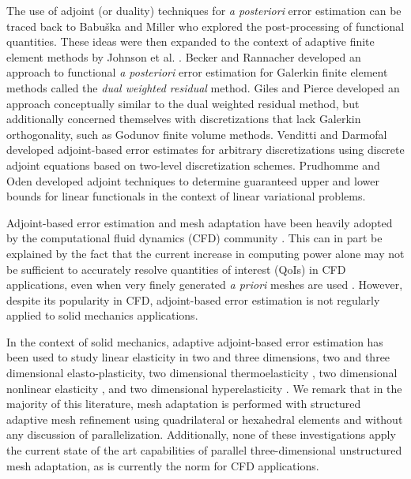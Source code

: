 The use of adjoint (or duality) techniques for \emph{a posteriori} error
estimation can be traced back to Babu\v{s}ka and Miller
\cite{babuska1984post1, babuska1984post2, babuska1984post3} who explored the
post-processing of functional quantities. These ideas were then expanded to the
context of adaptive finite element methods by Johnson et al.
\cite{eriksson1996computational}. Becker and Rannacher \cite{becker2001optimal}
developed an approach to functional \emph{a posteriori} error estimation for
Galerkin finite element methods called the \emph{dual weighted residual}
method. Giles and Pierce \cite{giles2003adjoint} developed an approach
conceptually similar to the dual weighted residual method, but additionally
concerned themselves with discretizations that lack Galerkin orthogonality,
such as Godunov finite volume methods. Venditti and Darmofal
\cite{venditti2000adjoint, venditti2002adjoint, venditti2003adjoint} developed
adjoint-based error estimates for arbitrary discretizations using discrete
adjoint equations based on two-level discretization schemes.
Prudhomme and Oden \cite{prudhomme1999goal, oden2001goal} developed
adjoint techniques to determine guaranteed upper and lower bounds for
linear functionals in the context of linear variational problems.

Adjoint-based error estimation and mesh adaptation have been heavily adopted
by the computational fluid dynamics (CFD) community \cite{fidkowski2011review}.
This can in part be explained by the fact that the current increase in
computing power alone may not be sufficient to accurately resolve
quantities of interest (QoIs) in CFD applications, even when very finely
generated \emph{a priori} meshes are used \cite{fidkowski2011review}. However,
despite its popularity in CFD, adjoint-based error estimation is not regularly
applied to solid mechanics applications.

In the context of solid mechanics, adaptive adjoint-based error estimation
has been used to study linear elasticity in two
\cite{rannacher1997feed, stein2007error, gonzalez2014mesh} and three
\cite{ghorashi2014goal} dimensions, two
\cite{rannacher1998posteriori, rannacher1999posteriori} and three
\cite{ghorashi2017goal} dimensional elasto-plasticity, two dimensional
thermoelasticity \cite{rabizadeh2015adaptive}, two dimensional
nonlinear elasticity \cite{larsson2002strategies}, and two dimensional
hyperelasticity \cite{whiteley2014error}. We remark that in the majority of
this literature, mesh adaptation is performed with structured adaptive mesh
refinement using quadrilateral or hexahedral elements and without any
discussion of parallelization. Additionally, none of these investigations
apply the current state of the art capabilities of parallel three-dimensional
unstructured mesh adaptation, as is currently the norm for CFD
applications.

